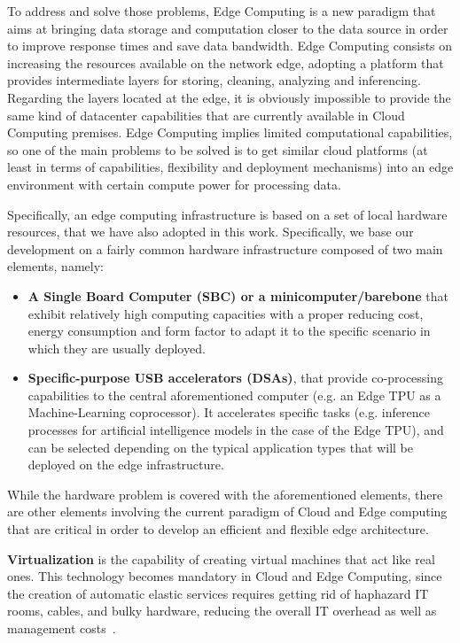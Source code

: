 To address and solve those problems, Edge Computing is a new paradigm that aims at bringing data storage and computation closer to the data source in order to improve response times and save data bandwidth. Edge Computing consists on increasing the resources available on the network edge, adopting a platform that provides intermediate layers for storing, cleaning, analyzing and inferencing.
%
Regarding the layers located at the edge, it is obviously impossible to provide the same kind of datacenter capabilities that are currently available in Cloud Computing premises. Edge Computing implies limited computational capabilities, so one of the main problems to be solved is to get similar cloud platforms (at least in terms of capabilities, flexibility and deployment mechanisms) into an edge environment with certain compute power for processing data.

Specifically, an edge computing infrastructure is based on a set of local hardware resources, that we have also adopted in this work. Specifically, we base our development on a fairly common hardware infrastructure composed of two main elements, namely:

\begin{itemize}
  \item \textbf{A Single Board Computer (SBC) or a minicomputer/barebone} that exhibit relatively high computing capacities with a proper reducing cost, energy consumption and form factor to adapt it to the specific scenario in which they are usually deployed.
  \item \textbf{Specific-purpose USB accelerators (DSAs)}, that provide co-processing capabilities to the central aforementioned computer (e.g. an Edge TPU as a Machine-Learning coprocessor). It accelerates specific tasks (e.g. inference processes for artificial intelligence models in the case of the Edge TPU), and can be selected depending on the typical application types that will be deployed on the edge infrastructure.
\end{itemize}

While the hardware problem is covered with the aforementioned elements, 
there are other elements involving the current paradigm of Cloud and Edge computing that are critical in order to develop an efficient and flexible edge architecture. 

\textbf{Virtualization} is the capability of creating virtual machines that act like real ones. This technology becomes mandatory in Cloud and Edge Computing, since the creation of automatic elastic services requires getting rid of haphazard IT rooms, cables, and bulky hardware, reducing the overall IT overhead as well as management costs~\cite{virt_def}.

